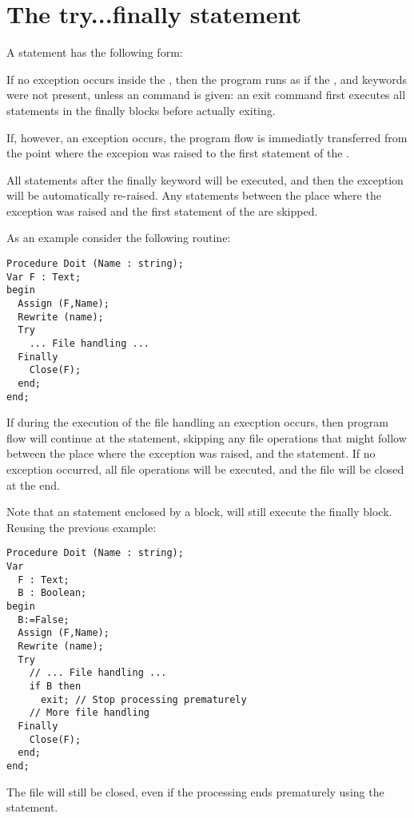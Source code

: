 \section{The try...finally statement}
  

A  statement has the following form:

If no exception occurs inside the , then the program
runs as if the ,  and  keywords were not
present, unless an  command is given: an exit command first 
executes all statements in the finally blocks before actually exiting.

If, however, an exception occurs, the program flow is immediatly
transferred from the point where the excepion was raised to the first
statement of the .

All statements after the finally keyword will be executed, and then
the exception will be automatically re-raised. Any statements between the
place where the exception was raised and the first statement of the
 are skipped.

As an example consider the following routine:
\begin{verbatim}
Procedure Doit (Name : string);
Var F : Text;
begin
  Assign (F,Name);
  Rewrite (name);
  Try
    ... File handling ...
  Finally
    Close(F);
  end;
end;
\end{verbatim}
If during the execution of the file handling an execption occurs, then
program flow will continue at the  statement, skipping any
file operations that might follow between the place where the exception
was raised, and the  statement.
If no exception occurred, all file operations will be executed, and the file
will be closed at the end.

Note that an  statement enclosed by a  block,
will still execute the finally block. Reusing the previous example:
\begin{verbatim}
Procedure Doit (Name : string);
Var 
  F : Text;
  B : Boolean;
begin
  B:=False;
  Assign (F,Name);
  Rewrite (name);
  Try
    // ... File handling ...
    if B then 
      exit; // Stop processing prematurely
    // More file handling
  Finally
    Close(F);
  end;
end;
\end{verbatim}
The file will still be closed, even if the processing ends prematurely using
the  statement.

